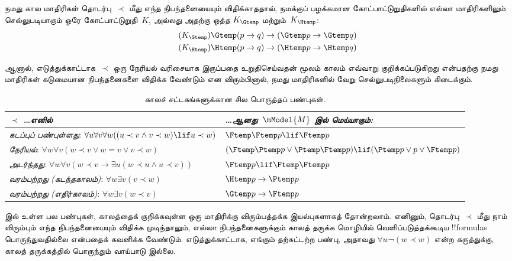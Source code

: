 \documentclass[../../../include/open-logic-section]{subfiles}
\begin{document}


நமது கால மாதிரிகள் தொடர்பு~$\prec$ மீது எந்த நிபந்தனையையும் விதிக்காததால்,
நமக்குப் பழக்கமான கோட்பாட்டுறுதிகளில் எல்லா மாதிரிகளிலும் செல்லுபடியாகும்
ஒரே கோட்பாட்டுறுதி~$K$, அல்லது அதற்கு ஒத்த $K_{\Gtemp}$ மற்றும்~$K_{\Htemp}$:
\begin{align*}
\tag{$K_{\Gtemp}$}  \Gtemp (p \to q) & \to (\Gtemp p \to \Gtemp q)\\
\tag{$K_{\Htemp}$}  \Htemp (p \to q) & \to (\Htemp p \to \Htemp q)
\end{align*}

ஆனால், எடுத்துக்காட்டாக~$\prec$ ஒரு நேரியல் வரிசையாக இருப்பதை உறுதிசெய்வதன்
மூலம் காலம் எவ்வாறு குறிக்கப்படுகிறது என்பதற்கு நமது மாதிரிகள் கடுமையான
நிபந்தனைகளை விதிக்க வேண்டும் என விரும்பினால், நமது மாதிரிகளில் வேறு
செல்லுபடிநிலைகளும் கிடைக்கும்.

\begin{table}[t]
  \begin{tabular}{| p{} || p{} |}
    \hline
    {\emph{$\prec$ \dots எனில்}} & {\emph{\dots ஆனது~$\mModel{M}$ இல் மெய்யாகும்:}} \\
    \hline \hline
    \emph{கடப்புப் பண்புள்ளது}: \newline
    $\forall u \forall v \forall w ((u \prec v \land v \prec w) \lif u \prec w)$ &
    $\Ftemp \Ftemp p \lif \Ftemp p$  \\
    \hline
    \emph{நேரியல்}: \newline
    $\forall w \forall v (w \prec v \lor w = v \lor v \prec w)$ &
    $(\Ftemp \Ptemp  p \lor \Ptemp \Ftemp p) \lif (\Ptemp p \lor p \lor \Ftemp p)$\\
    \hline
    \emph{அடர்ந்தது}: \newline
    $\forall w \forall v (w \prec v \to \exists u(w \prec u \land u \prec v))$ &
    $\Ftemp p \lif \Ftemp \Ftemp p$ \\
    \hline
    \emph{வரம்பற்றது (கடந்தகாலம்)}: \newline
    $\forall w \exists v( v \prec w)$ &
    $\Htemp p \to \Ptemp p$ \\
    \hline
    \emph{வரம்பற்றது (எதிர்காலம்)}: \newline
    $\forall w \exists v( w \prec v)$ &
    $\Gtemp p \to \Ftemp p$ \\
    \hline
  \end{tabular}
  \caption{காலச் சட்டகங்களுக்கான சில பொருத்தப் பண்புகள்.}
\end{table}

 இல் உள்ள பல பண்புகள், காலத்தைக் குறிக்கவுள்ள ஒரு
மாதிரிக்கு விரும்பத்தக்க இயல்புகளாகத் தோன்றலாம். எனினும், தொடர்பு~$\prec$
மீது நாம் விரும்பும் எந்த நிபந்தனையையும் விதிக்க முடிந்தாலும், எல்லா
நிபந்தனைகளுக்கும் காலத் தருக்க மொழியில் வெளிப்படுத்தக்கூடிய !!{formula}s
பொருந்துவதில்லை என்பதைக் கவனிக்க வேண்டும். எடுத்துக்காட்டாக, எங்கும்
தற்சுட்டற்ற பண்பு, அதாவது $\forall w \lnot (w \prec w)$ என்ற கருத்துக்கு,
காலத் தருக்கத்தில் பொருந்தும் வாய்பாடு இல்லை.
\end{document}
